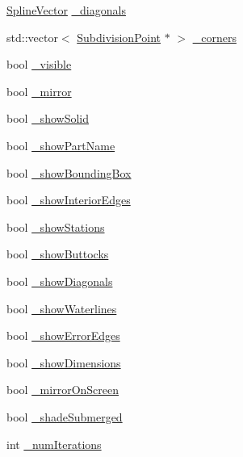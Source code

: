\begin{DoxyCompactItemize}
\hyperlink{namespaceShipCAD_a053b941b2c87049bb9380428d4d5a056}{Spline\+Vector} \hyperlink{classShipCAD_1_1DevelopedPatch_aff34f25567574603034ffbab8892ad21}{\+\_\+diagonals}
\item 
std\+::vector$<$ \hyperlink{classShipCAD_1_1SubdivisionPoint}{Subdivision\+Point} $\ast$ $>$ \hyperlink{classShipCAD_1_1DevelopedPatch_ae668e0bc0c43821a883881c752fd4725}{\+\_\+corners}
\item 
bool \hyperlink{classShipCAD_1_1DevelopedPatch_ab4f30ac4039457e394a106294150a5eb}{\+\_\+visible}
\item 
bool \hyperlink{classShipCAD_1_1DevelopedPatch_add1e0f68f33725c24a71bbd46e13820b}{\+\_\+mirror}
\item 
bool \hyperlink{classShipCAD_1_1DevelopedPatch_af60d915295602a7d973f4accfe6f1074}{\+\_\+show\+Solid}
\item 
bool \hyperlink{classShipCAD_1_1DevelopedPatch_a18bd449dd6e474499a1fb28f20140919}{\+\_\+show\+Part\+Name}
\item 
bool \hyperlink{classShipCAD_1_1DevelopedPatch_a9f3f6d98182ef33bf1bef3bdacd41ecc}{\+\_\+show\+Bounding\+Box}
\item 
bool \hyperlink{classShipCAD_1_1DevelopedPatch_a7ac65e1c08ede7d63c94b4da7bfe6443}{\+\_\+show\+Interior\+Edges}
\item 
bool \hyperlink{classShipCAD_1_1DevelopedPatch_ab970c1f908562c329577a568aa011268}{\+\_\+show\+Stations}
\item 
bool \hyperlink{classShipCAD_1_1DevelopedPatch_a647c43e415156bab3ecda6a849d4bb70}{\+\_\+show\+Buttocks}
\item 
bool \hyperlink{classShipCAD_1_1DevelopedPatch_aff3046ee214026327f4cfda2733c31c6}{\+\_\+show\+Diagonals}
\item 
bool \hyperlink{classShipCAD_1_1DevelopedPatch_a876f5a294f194b79112c224ed66db35d}{\+\_\+show\+Waterlines}
\item 
bool \hyperlink{classShipCAD_1_1DevelopedPatch_af20d320001ec91d649b59488bf08000e}{\+\_\+show\+Error\+Edges}
\item 
bool \hyperlink{classShipCAD_1_1DevelopedPatch_a349177098a4fcdbc6bf3812a79e3cb49}{\+\_\+show\+Dimensions}
\item 
bool \hyperlink{classShipCAD_1_1DevelopedPatch_a86574c4cb5748be1725e4a489270db1a}{\+\_\+mirror\+On\+Screen}
\item 
bool \hyperlink{classShipCAD_1_1DevelopedPatch_a85a8213cf1d96c9c1a959a67223971ea}{\+\_\+shade\+Submerged}
\item 
int \hyperlink{classShipCAD_1_1DevelopedPatch_ae3ef9cf6fd1e85f4739ea676b1a10aac}{\+\_\+num\+Iterations}

\end{DoxyCompactItemize}
